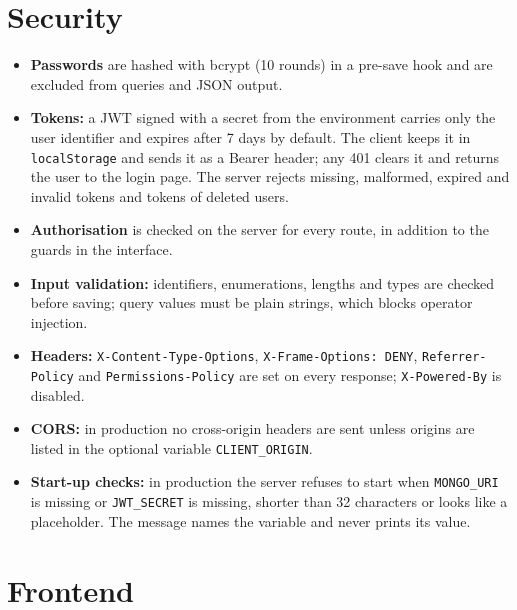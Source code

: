 \documentclass[11pt,a4paper]{article}
\newcommand{\code}[1]{\texttt{#1}}
\begin{document}
\section{Security}
\begin{itemize}
  \item \textbf{Passwords} are hashed with bcrypt (10 rounds) in a pre-save hook and are excluded from queries and JSON output.
  \item \textbf{Tokens:} a JWT signed with a secret from the environment carries only the user identifier and expires after 7 days by default. The client keeps it in \code{localStorage} and sends it as a Bearer header; any 401 clears it and returns the user to the login page. The server rejects missing, malformed, expired and invalid tokens and tokens of deleted users.
  \item \textbf{Authorisation} is checked on the server for every route, in addition to the guards in the interface.
  \item \textbf{Input validation:} identifiers, enumerations, lengths and types are checked before saving; query values must be plain strings, which blocks operator injection.
  \item \textbf{Headers:} \code{X-Content-Type-Options}, \code{X-Frame-Options: DENY}, \code{Referrer-Policy} and \code{Permissions-Policy} are set on every response; \code{X-Powered-By} is disabled.
  \item \textbf{CORS:} in production no cross-origin headers are sent unless origins are listed in the optional variable \code{CLIENT\_ORIGIN}.
  \item \textbf{Start-up checks:} in production the server refuses to start when \code{MONGO\_URI} is missing or \code{JWT\_SECRET} is missing, shorter than 32 characters or looks like a placeholder. The message names the variable and never prints its value.
\end{itemize}

\section{Frontend}
\end{document}
